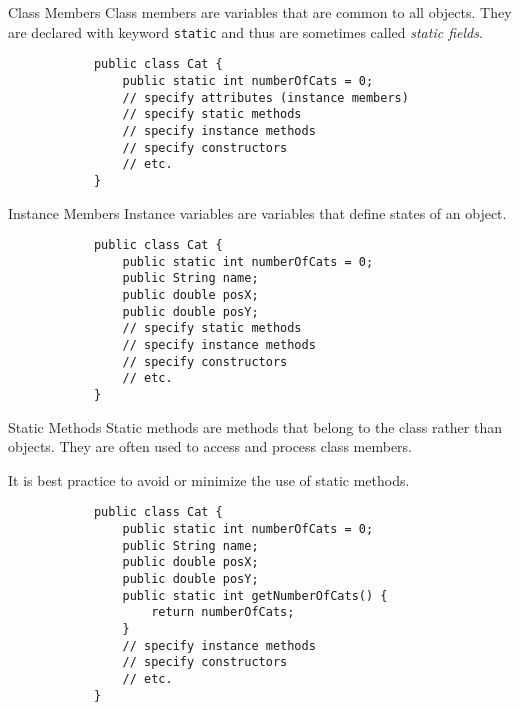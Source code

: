 \documentclass[10pt, compress]{beamer}
\begin{document}
\begin{slide}
	\begin{block}{Class Members}
		Class members are variables that are common to all objects.
		They are declared with keyword \texttt{static} and thus are sometimes called \emph{static fields}.
		\begin{verbatim}
			public class Cat {
			    public static int numberOfCats = 0;
			    // specify attributes (instance members)
			    // specify static methods
			    // specify instance methods
			    // specify constructors
			    // etc.
			}
		\end{verbatim}
	\end{block}
\end{slide}

\begin{slide}
	\begin{block}{Instance Members}
		Instance variables are variables that define states of an object.
		\begin{verbatim}
			public class Cat {
			    public static int numberOfCats = 0;
			    public String name;
			    public double posX;
			    public double posY;
			    // specify static methods
			    // specify instance methods
			    // specify constructors
			    // etc.
			}
		\end{verbatim}
	\end{block}
\end{slide}

\begin{slide}
	\begin{block}{Static Methods}
		Static methods are methods that belong to the class rather than objects.
		They are often used to access and process class members.

		It is best practice to avoid or minimize the use of static methods.
		\begin{verbatim}
			public class Cat {
			    public static int numberOfCats = 0;
			    public String name;
			    public double posX;
			    public double posY;
			    public static int getNumberOfCats() {
			        return numberOfCats;
			    }
			    // specify instance methods
			    // specify constructors
			    // etc.
			}
		\end{verbatim}
	\end{block}
\end{slide}
\end{document}
